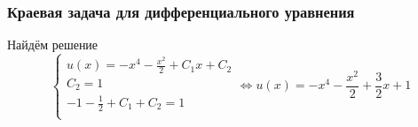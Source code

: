 \documentclass[10pt]{beamer}
\begin{document}
\begin{frame}[fragile]
\frametitle{Краевая задача для дифференциального уравнения}
Найдём решение
$$
\begin{cases}
u(x) = - x^4 - \frac{x^2}{2} + C_1 x + C_2\\
C_2 = 1\\
-1 - \frac12 + C_1 + C_2 = 1\\
\end{cases}
\Leftrightarrow
u(x) = - x^4 - \frac{x^2}{2} + \frac{3}{2} x + 1
$$

\begin{center}
\end{center}
\end{frame}
\end{document}
